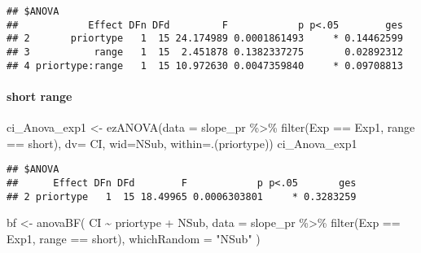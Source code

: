 \documentclass[
]{article}
\newenvironment{Shaded}{\begin{snugshade}}{\end{snugshade}}
\newcommand{\AttributeTok}[1]{\textcolor[rgb]{0.77,0.63,0.00}{#1}}
\newcommand{\FunctionTok}[1]{\textcolor[rgb]{0.00,0.00,0.00}{#1}}
\newcommand{\NormalTok}[1]{#1}
\newcommand{\OtherTok}[1]{\textcolor[rgb]{0.56,0.35,0.01}{#1}}
\newcommand{\SpecialCharTok}[1]{\textcolor[rgb]{0.00,0.00,0.00}{#1}}
\newcommand{\StringTok}[1]{\textcolor[rgb]{0.31,0.60,0.02}{#1}}
\begin{document}
\begin{verbatim}
## $ANOVA
##            Effect DFn DFd         F            p p<.05        ges
## 2       priortype   1  15 24.174989 0.0001861493     * 0.14462599
## 3           range   1  15  2.451878 0.1382337275       0.02892312
## 4 priortype:range   1  15 10.972630 0.0047359840     * 0.09708813
\end{verbatim}

\hypertarget{short-range}{%
\paragraph{short range}\label{short-range}}

\begin{Shaded}
\begin{Highlighting}[]
\NormalTok{ci\_Anova\_exp1 }\OtherTok{\textless{}{-}} \FunctionTok{ezANOVA}\NormalTok{(}\AttributeTok{data =}\NormalTok{ slope\_pr }\SpecialCharTok{\%\textgreater{}\%} \FunctionTok{filter}\NormalTok{(Exp }\SpecialCharTok{==} \StringTok{\textquotesingle{}Exp1\textquotesingle{}}\NormalTok{, range }\SpecialCharTok{==} \StringTok{\textquotesingle{}short\textquotesingle{}}\NormalTok{), }\AttributeTok{dv=}\NormalTok{ CI, }\AttributeTok{wid=}\NormalTok{NSub, }\AttributeTok{within=}\NormalTok{.(priortype))}
\NormalTok{ci\_Anova\_exp1}
\end{Highlighting}
\end{Shaded}

\begin{verbatim}
## $ANOVA
##      Effect DFn DFd        F            p p<.05       ges
## 2 priortype   1  15 18.49965 0.0006303801     * 0.3283259
\end{verbatim}

\begin{Shaded}
\begin{Highlighting}[]
\NormalTok{bf }\OtherTok{\textless{}{-}} \FunctionTok{anovaBF}\NormalTok{( CI }\SpecialCharTok{\textasciitilde{}}\NormalTok{ priortype }\SpecialCharTok{+}\NormalTok{ NSub, }\AttributeTok{data =}\NormalTok{  slope\_pr }\SpecialCharTok{\%\textgreater{}\%} \FunctionTok{filter}\NormalTok{(Exp }\SpecialCharTok{==} \StringTok{\textquotesingle{}Exp1\textquotesingle{}}\NormalTok{, range }\SpecialCharTok{==} \StringTok{\textquotesingle{}short\textquotesingle{}}\NormalTok{), }\AttributeTok{whichRandom =} \StringTok{"NSub"}\NormalTok{ ) }
\end{Highlighting}
\end{Shaded}
\end{document}
